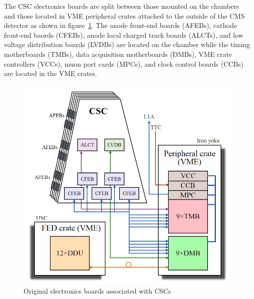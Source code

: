 \documentclass[10pt,a4paper]{article}
\begin{document}
The CSC electronics boards are split between those mounted on the chambers and those located in VME peripheral crates attached to the outside of the CMS detector as shown in figure~\ref{fig:cscelectronics}. The anode front-end boards (AFEBs), cathode front-end baords (CFEBs), anode local charged track boards (ALCTs), and low voltage distribution boards (LVDBs) are located on the chamber while the timing motherboards (TMBs), data acquisition motherboards (DMBs), VME crate controllers (VCCs), muon port cards (MPCs), and clock control boards (CCBs) are located in the VME crates. 

\begin{figure}[H]
\centering
\includegraphics[width= 0.6 \textwidth]{figures/cscelectronics.png}
\caption{Original electronics boards associated with CSCs}
\label{fig:cscelectronics}
\end{figure}
\end{document}
